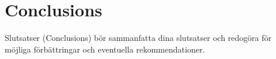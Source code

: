\chapter{Conclusions}
Slutsatser (Conclusions) bör sammanfatta dina slutsatser och redogöra för möjliga förbättringar och eventuella rekommendationer.